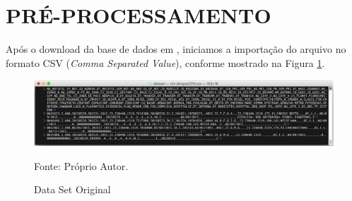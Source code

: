 \documentclass[
	12pt,				%
	openright,			%
	oneside,	
	a4paper,				%
	english,				%
	brazil				%
]{abntex2/abntex2} %
\begin{document}

	
	\section{PRÉ-PROCESSAMENTO}
	\label{Pré-processamento}
	
	Após o download da base de dados em \cite{fortaleza:2015},  iniciamos a importação do arquivo no formato CSV (\textit{Comma Separated Value}), conforme mostrado na Figura \ref{figdataSetOriginal}.
	
		
		\begin{figure}[!htb]
			\caption{\label{figdataSetOriginal} \fontsize{10}{\baselineskip} \selectfont Data Set Original}
			\begin{center}
				\includegraphics[scale=0.4]{img/dataSetOriginal.png}
			\end{center}
			{\fontsize{10}{\baselineskip} \selectfont Fonte: Próprio Autor.}
		\end{figure}
	
\end{document}
